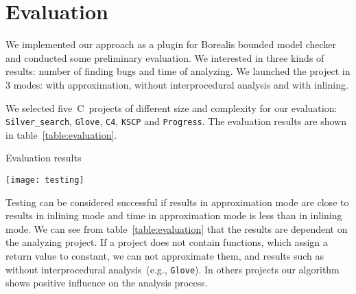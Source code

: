 \section{Evaluation}\label{sec:evaluation}

We implemented our approach as a plugin for Borealis bounded model checker and conducted some preliminary evaluation. We interested in three kinds of results: number of finding bugs and time of analyzing. We launched the project in 3 modes: with approximation, without interprocedural analysis and with inlining.

We selected five~C~projects of different size and complexity for our evaluation: \texttt{Silver_search}, \texttt{Glove}, \texttt{C4}, \texttt{KSCP} and \texttt{Progress}. The evaluation results are shown in table~\ref{table:evaluation}.

\begin{table}[H]
\centering
\caption{Evaluation results}
\label{table:evaluation}
\texttt{[image: testing]}
\end{table}

Testing can be considered successful if results in approximation mode are close to results in inlining mode and time in approximation mode is less than in inlining mode. We can see from table~\ref{table:evaluation} that the results are dependent on the analyzing project. If a project does not contain functions, which assign a return value to constant, we can not approximate them, and results such as without interprocedural analysis~(e.g., \texttt{Glove}). In others projects our algorithm shows positive influence on the analysis process. 
